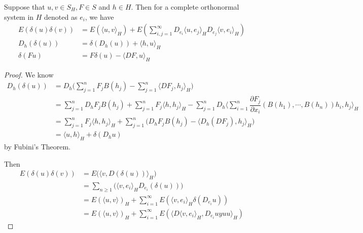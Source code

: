 \documentclass[lang=en, color=blue, ]{elegantbook}
\begin{document}
\begin{proposition}
    Suppose that $u,v \in S_H, F\in S$ and $h \in H$. Then for a complete orthonormal system in $H$ denoted as $e_i$, we have
    \[
    \begin{aligned}
        E(\delta(u)\delta(v)) &= E(\langle u,v\rangle_H) + E(\sum\limits_{i,j=1}^{\infty} D_{e_i}\langle u,e_j\rangle_H D_{e_j}\langle v,e_i\rangle_H) \\
        D_h(\delta(u)) &= \delta(D_h(u)) + \langle h,u\rangle_H \\
        \delta(Fu) &= F\delta(u) - \langle DF,u\rangle_H
    \end{aligned}
    \]
\end{proposition}
\begin{proof}
    We know
    \[
    \begin{aligned}
    D_h(\delta(u)) &= D_h\Big(\sum\limits_{j=1}^n F_jB(h_j) - \sum\limits_{j=1}^n \langle DF_j,h_j\rangle_H\Big) \\
    &= \sum\limits_{j=1}^n D_hF_j B(h_j) + \sum\limits_{j=1}^n F_j \langle h,h_j\rangle_H - \sum\limits_{j=1}^n D_h\Big\langle \sum\limits_{i=1}^n \dfrac{\partial F_j}{\partial x_i}(B(h_1),\cdots,B(h_n))h_i, h_j\Big\rangle_H \\
    & = \sum\limits_{j=1}^n F_j \langle h,h_j\rangle_H + \sum\limits_{j=1}^n \Big(D_h F_jB(h_j) - \langle D_h(DF_j), h_j \rangle_H\Big) \\
    & = \langle u,h\rangle_H + \delta(D_h u)
    \end{aligned}
    \]
    by Fubini's Theorem.\par
    Then
    \[
    \begin{aligned}
        E(\delta(u)\delta(v)) &= E\Big(\langle v,D(\delta(u))\rangle_H\Big)\\
        &= \sum\limits_{n\geq 1}\Big(\langle v,e_i\rangle_H D_{e_i}(\delta(u))) \\
        &= E(\langle u,v\rangle)_H + \sum\limits_{i=1}^{\infty}E(\langle v,e_i\rangle_H \delta(D_{e_i} u))\\
        & = E(\langle u,v\rangle)_H + \sum\limits_{i=1}^{\infty}E(\langle D\langle v,e_i\rangle_H, D_{e_i}uyu u \rangle_H)
    \end{aligned}
    \]
\end{proof}
\end{document}
